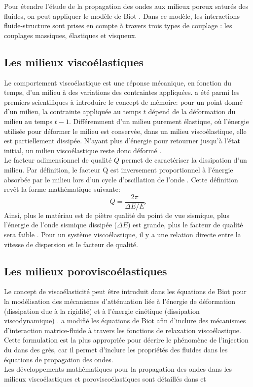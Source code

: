 Pour étendre l'étude de la propagation des ondes aux milieux poreux saturés
des fluides, on peut appliquer le modèle de Biot \citep{Biot1956a,Biot1956b}. Dans ce
modèle, les interactions fluide-structure sont prises en compte à travers trois
types de couplage : les couplages massiques, élastiques et visqueux.
\subsection{Les milieux viscoélastiques}
Le comportement viscoélastique est une réponse mécanique, en fonction du temps,
d'un milieu à des variations des contraintes appliquées. \citet{Boltzmann1874} a
été parmi les premiers scientifiques à introduire le concept de mémoire: pour un
point donné d'un milieu, la contrainte appliquée au temps $t$ dépend de la
déformation du milieu au temps $t-1$. Différemment d'un milieu purement
élastique, où l'énergie utilisée pour déformer le milieu est conservée, dans un
milieu viscoélastique, elle est partiellement dissipée. N'ayant plus d'énergie
pour retourner jusqu'à l'état initial, un milieu viscoélastique reste donc déformé
\citep{Carcione2007}. \\
Le facteur adimensionnel de qualité $Q$ permet de caractériser la dissipation
d'un milieu. Par définition, le facteur Q est inversement proportionnel à
l’énergie absorbée par le milieu lors d’un cycle d’oscillation de l’onde
\citep{Sheriff1995}.  Cette définition revêt la forme
mathématique suivante:
\begin{equation}
Q = \dfrac{2\pi}{\Delta E /E}.
\label{eq:facteur_Q}
\end{equation}
Ainsi, plus le matériau est de piètre qualité du point de vue sismique, plus
l’énergie de l’onde sismique dissipée ($\Delta E$) est grande, plus le facteur
de qualité sera faible \citep{Giroux2001}. Pour un système viscoélastique, il y
a une relation directe entre la vitesse de dispersion et le facteur de qualité.
\subsection{Les milieux poroviscoélastiques}
Le concept de viscoélasticité peut être introduit dans les équations de Biot
\citep{Biot1956a,Biot1956b} pour la modélisation des mécanismes d'atténuation
liée à l'énergie de déformation (dissipation due à la rigidité) et à l'énergie
cinétique (dissipation viscodynamique) \citep{Carcione2007}.
\citet{Carcione1998} a modifié les équations de Biot afin d'inclure des
mécanismes d'interaction matrice-fluide à travers les fonctions de relaxation
viscoélastique. Cette formulation est la plus appropriée pour décrire le
phénomène de l'injection du  dans des grès, car il permet d’inclure les
propriétés des fluides dans les équations de propagation des ondes.\\
Les développements mathématiques pour la propagation des ondes dans les milieux
viscoélastiques et poroviscoélastiques sont détaillés dans \citet{Bourbie1986}
et \citet{Carcione2007}
